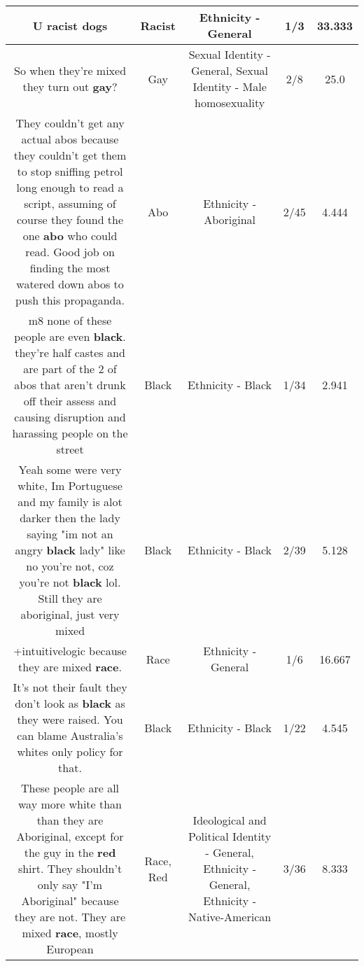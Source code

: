 \documentclass[11pt]{article}
\newlength\mylength
\begin{document}
\begin{center}
\begin{longtable}{|C{.65\mylength}|C{.30\mylength}|C{.12\mylength}|C{.12\mylength}|C{.12\mylength}|}
  \small U \textbf{racist} dogs\normalsize   & Racist & Ethnicity - General & 1/3 & 33.333 \\  \hline
  \small So when they're mixed they turn out \textbf{g\textbf{ay}}?\normalsize   & Gay & Sexual Identity - General, Sexual Identity - Male homosexuality & 2/8 & 25.0 \\  \hline
  \small They couldn't get any actual abos because they couldn't get them to stop sniffing petrol long enough to read a script, assuming of course they found the one \textbf{abo} who could read. Good job on finding the most watered down abos to push this propaganda.\normalsize   & Abo & Ethnicity - Aboriginal & 2/45 & 4.444 \\  \hline
  \small m8 none of these people are even \textbf{black}. they're half castes and are part of the 2 of abos that aren't drunk off their assess and causing disruption and harassing people on the street\normalsize   & Black & Ethnicity - Black & 1/34 & 2.941 \\  \hline
  \small Yeah some were very white, Im Portuguese and my family is alot darker then the lady saying "im not an angry \textbf{black} lady" like no you're not, coz you're not \textbf{black} lol. Still they are aboriginal, just very mixed\normalsize   & Black & Ethnicity - Black & 2/39 & 5.128 \\  \hline
  \small +intuitivelogic because they are mixed \textbf{race}.\normalsize   & Race & Ethnicity - General & 1/6 & 16.667 \\  \hline
  \small It's not their fault they don't look as \textbf{black} as they were raised. You can blame Australia's whites only  policy for that.\normalsize   & Black & Ethnicity - Black & 1/22 & 4.545 \\  \hline
  \small These people are all way more white than than they are Aboriginal, except for the guy in the \textbf{r\textbf{ed}} shirt.  They shouldn't only say "I'm Aboriginal" because they are not.  They are mixed \textbf{race}, mostly European\normalsize   & Race, Red &  Ideological and Political Identity - General, Ethnicity - General, Ethnicity - Native-American & 3/36 & 8.333 \\  \hline

\end{longtable}
\end{center}
\end{document}
